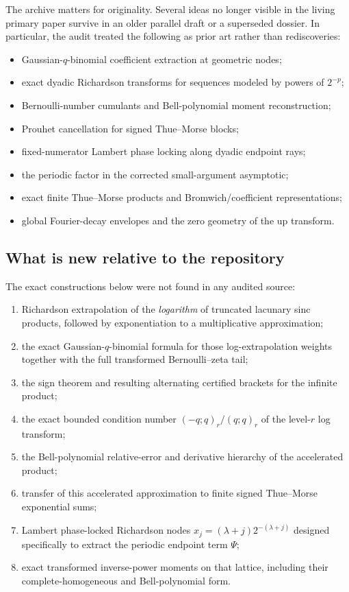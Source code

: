\documentclass[11pt]{article}
\numberwithin{equation}{section}
\theoremstyle{definition}
\theoremstyle{remark}
\begin{document}
The archive matters for originality. Several ideas no longer visible in the living primary paper survive in an older parallel draft or a superseded dossier. In particular, the audit treated the following as prior art rather than rediscoveries:
\begin{itemize}
\item Gaussian-$q$-binomial coefficient extraction at geometric nodes;
\item exact dyadic Richardson transforms for sequences modeled by powers of $2^{-p}$;
\item Bernoulli-number cumulants and Bell-polynomial moment reconstruction;
\item Prouhet cancellation for signed Thue--Morse blocks;
\item fixed-numerator Lambert phase locking along dyadic endpoint rays;
\item the periodic factor in the corrected small-argument asymptotic;
\item exact finite Thue--Morse products and Bromwich/coefficient representations;
\item global Fourier-decay envelopes and the zero geometry of the up transform.
\end{itemize}

\subsection{What is new relative to the repository}

The exact constructions below were not found in any audited source:
\begin{enumerate}
\item Richardson extrapolation of the \emph{logarithm} of truncated lacunary sinc products, followed by exponentiation to a multiplicative approximation;
\item the exact Gaussian-$q$-binomial formula for those log-extrapolation weights together with the full transformed Bernoulli--zeta tail;
\item the sign theorem and resulting alternating certified brackets for the infinite product;
\item the exact bounded condition number $(-q;q)_r/(q;q)_r$ of the level-$r$ log transform;
\item the Bell-polynomial relative-error and derivative hierarchy of the accelerated product;
\item transfer of this accelerated approximation to finite signed Thue--Morse exponential sums;
\item Lambert phase-locked Richardson nodes $x_j=(\lambda+j)2^{-(\lambda+j)}$ designed specifically to extract the periodic endpoint term $\Psi$;
\item exact transformed inverse-power moments on that lattice, including their complete-homogeneous and Bell-polynomial form.
\end{enumerate}
\end{document}
